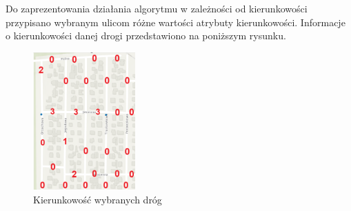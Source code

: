 \documentclass{article}
\begin{document}
Do zaprezentowania działania algorytmu w zależności od kierunkowości przypisano wybranym ulicom różne wartości atrybuty kierunkowości. Informacje o kierunkowości danej
drogi przedstawiono na poniższym rysunku.
\begin{figure}[H]
    \centering
    \includegraphics[width=0.35\textwidth]{img/kierunek-opis.png}
    \caption{Kierunkowość wybranych dróg}
\end{figure}
\end{document}
